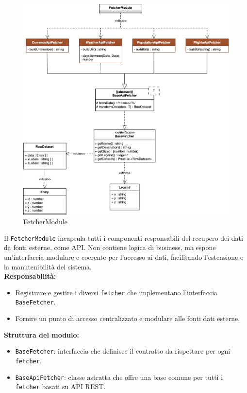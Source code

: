 \begin{figure}[H] 
    \centering
    \includegraphics[scale = 0.4]{template/images/uml_back/FetcherModule.png}
    \caption{FetcherModule}
\end{figure}

Il \texttt{FetcherModule} incapsula tutti i componenti responsabili del recupero dei dati da fonti esterne, come API. Non contiene logica di business, ma espone un'interfaccia modulare e coerente per l’accesso ai dati, facilitando l’estensione e la manutenibilità del sistema.\\

\textbf{Responsabilità:}
\begin{itemize}
    \item Registrare e gestire i diversi \texttt{fetcher} che implementano l’interfaccia \texttt{BaseFetcher}.
    \item Fornire un punto di accesso centralizzato e modulare alle fonti dati esterne.
\end{itemize}

\textbf{Struttura del modulo:}
\begin{itemize}
    \item \texttt{BaseFetcher}: interfaccia che definisce il contratto da rispettare per ogni \texttt{fetcher}.
    \item \texttt{BaseApiFetcher}: classe astratta che offre una base comune per tutti i \texttt{fetcher} basati su API REST.
\end{itemize}

